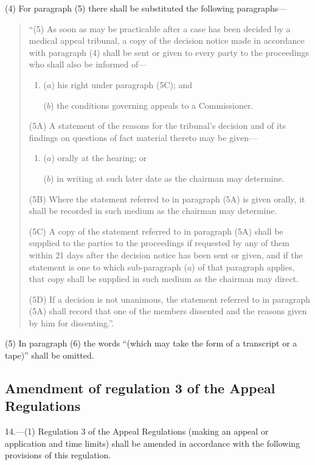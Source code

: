 \documentclass[a4paper]{article}
\begin{document}
(4) For paragraph (5) there shall be substituted the following paragraphs—
\begin{quotation}
“(5) As soon as may be practicable after a case has been decided by a medical appeal tribunal, a copy of the decision notice made in accordance with paragraph (4) shall be sent or given to every party to the proceedings who shall also be informed of—
\begin{enumerate}\item[]
($a$) his right under paragraph (5C); and

($b$) the conditions governing appeals to a Commissioner.
\end{enumerate}

(5A) A statement of the reasons for the tribunal’s decision and of its findings on questions of fact material thereto may be given—
\begin{enumerate}\item[]
($a$) orally at the hearing; or

($b$) in writing at such later date as the chairman may determine.
\end{enumerate}

(5B) Where the statement referred to in paragraph (5A) is given orally, it shall be recorded in such medium as the chairman may determine.

(5C) A copy of the statement referred to in paragraph (5A) shall be supplied to the parties to the proceedings if requested by any of them within 21 days after the decision notice has been sent or given, and if the statement is one to which sub-paragraph ($a$) of that paragraph applies, that copy shall be supplied in such medium as the chairman may direct.

(5D) If a decision is not unanimous, the statement referred to in paragraph (5A) shall record that one of the members dissented and the reasons given by him for dissenting.”.
\end{quotation}

(5) In paragraph (6) the words “(which may take the form of a transcript or a tape)” shall be omitted.

\subsection[14. Amendment of regulation 3 of the Appeal Regulations]{Amendment of regulation 3 of the Appeal Regulations}

14.—(1) Regulation 3 of the Appeal Regulations (making an appeal or application and time limits) shall be amended in accordance with the following provisions of this regulation.
\end{document}
